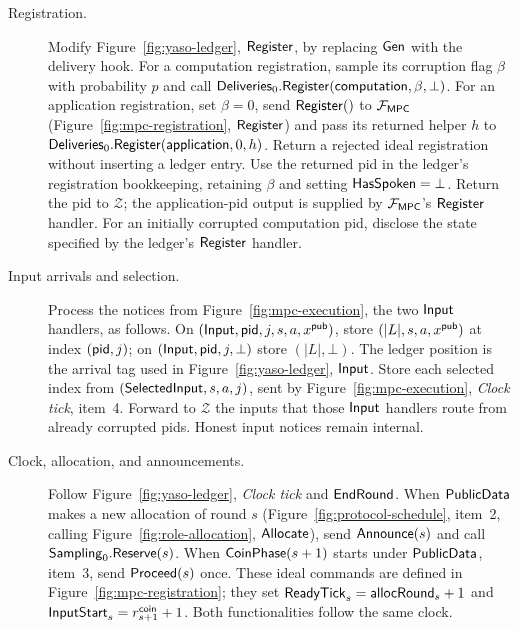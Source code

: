 \begin{description}
\item[Registration.]
 Modify Figure~\ref{fig:yaso-ledger}, $\mathsf{Register}$, by replacing
 $\mathsf{Gen}$ with the delivery hook.  For a computation registration, sample
 its corruption flag $\beta$ with probability $p$ and call
 $\mathsf{Deliveries}_0.\mathsf{Register}(\mathsf{computation},\beta,\bot)$.
 For an application registration, set $\beta=0$, send $\mathsf{Register}()$ to $\mathcal F_{\mathsf{MPC}}$
 (Figure~\ref{fig:mpc-registration}, $\mathsf{Register}$) and pass its returned
 helper $h$ to $\mathsf{Deliveries}_0.\mathsf{Register}(\mathsf{application},0,h)$.
 Return a rejected ideal registration without inserting a ledger entry.
 Use the returned pid in the ledger's registration bookkeeping, retaining
 $\beta$ and setting $\mathsf{HasSpoken}=\bot$.  Return the pid to $\mathcal Z$;
 the application-pid output is supplied by $\mathcal F_{\mathsf{MPC}}$'s $\mathsf{Register}$ handler.
 For an initially corrupted computation pid, disclose the state specified
 by the ledger's $\mathsf{Register}$ handler.

\item[Input arrivals and selection.]
 Process the notices from Figure~\ref{fig:mpc-execution}, the two
 $\mathsf{Input}$ handlers, as follows.  On $(\mathsf{Input},\mathsf{pid},j,s,a,x^{\mathsf{pub}})$, store
 $(|L|,s,a,x^{\mathsf{pub}})$ at index $(\mathsf{pid},j)$; on $(\mathsf{Input},\mathsf{pid},j,\bot)$ store
 $(|L|,\bot)$.  The ledger position is the arrival tag used in
 Figure~\ref{fig:yaso-ledger}, $\mathsf{Input}$.
 Store each selected index from $(\mathsf{SelectedInput},s,a,j)$, sent by
 Figure~\ref{fig:mpc-execution}, \emph{Clock tick}, item~4.
 Forward to $\mathcal Z$ the inputs that those $\mathsf{Input}$ handlers route
 from already corrupted pids.  Honest input notices remain internal.

\item[Clock, allocation, and announcements.]
 Follow Figure~\ref{fig:yaso-ledger}, \emph{Clock tick} and $\mathsf{EndRound}$.
 When $\mathsf{PublicData}$ makes a new allocation of round $s$
 (Figure~\ref{fig:protocol-schedule}, item~2, calling
 Figure~\ref{fig:role-allocation}, $\mathsf{Allocate}$), send $\mathsf{Announce}(s)$
 and call $\mathsf{Sampling}_0.\mathsf{Reserve}(s)$.
 When $\mathsf{CoinPhase}(s+1)$ starts under $\mathsf{PublicData}$, item~3, send
 $\mathsf{Proceed}(s)$ once.  These ideal commands are defined in
 Figure~\ref{fig:mpc-registration}; they set
 $\mathsf{ReadyTick}_s=\mathsf{allocRound}_s+1$ and
 $\mathsf{InputStart}_s=r^{\mathsf{coin}}_{s+1}+1$.
 Both functionalities follow the same clock.


\end{description}
